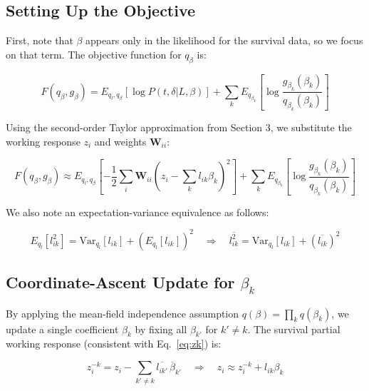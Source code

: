 \documentclass{article}[12pt]
\begin{document}
\subsection{Setting Up the Objective}

First, note that $\beta$ appears only in the likelihood for the survival data, so we focus on that term. The objective function for $q_\beta$ is:

\begin{equation}
    F\left(q_{\beta}, g_{\beta}\right) = E_{q_l, q_{\beta}}\left[\log P\left(t, \delta \vert L, \beta\right)\right] + \sum_{k}E_{q_{\beta_k}}\left[\log \frac{g_{\beta_k}\left(\beta_k\right)}{q_{\beta_k}\left(\beta_k\right)}\right]
\end{equation}

Using the second-order Taylor approximation from Section 3, we substitute the working response $z_i$ and weights $\mathbf{W}_{ii}$:

\begin{equation}
    F(q_{\beta}, g_{\beta}) \approx E_{q_l, q_{\beta}} \left[ -\frac{1}{2}\sum_i \mathbf{W}_{ii}\left(z_i - \sum_k l_{ik}\beta_k\right)^2 \right] + \sum_k E_{q_{\beta_k}} \left[ \log \frac{g_{\beta_k}(\beta_k)}{q_{\beta_k}(\beta_k)} \right]\label{eq:Fqb-approx}
\end{equation}

We also note an expectation-variance equivalence as follows:

\begin{equation}
    E_{q_l}\left[l_{ik}^{2}\right] = \mathrm{Var}_{q_l}\left[l_{ik}\right] + \left(E_{q_l}\left[l_{ik}\right]\right)^2 \quad\Rightarrow\quad \overline{l_{ik}^{2}} = \mathrm{Var}_{q_l}\left[l_{ik}\right] + \left(\overline{l_{ik}}\right)^2
\end{equation}

\subsection{Coordinate-Ascent Update for $\beta_k$}

By applying the mean-field independence assumption $q(\beta) = \prod_k q(\beta_k)$, we update a single coefficient $\beta_k$ by fixing all $\beta_{k'}$ for $k' \neq k$. The survival partial working response (consistent with Eq.~\ref{eq:zk}) is:

\begin{equation}
    z_i^{-k} = z_i - \sum_{k' \neq k} \overline{l_{ik'}} \,\overline{\beta}_{k'}
    \quad\Rightarrow\quad z_i \approx z_i^{-k} + l_{ik}\beta_k
\end{equation}
\end{document}
